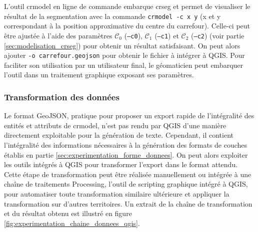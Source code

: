 \newpar{}

L'outil crmodel en ligne de commande embarque crseg et permet de visualiser le résultat de la segmentation avec la commande \texttt{crmodel -c x y} (x et y correspondant à la position approximative du centre du carrefour). Celle-ci peut être ajustée à l'aide des paramètres $\mathcal{C}_0$ (\texttt{--c0}), $\mathcal{C}_1$ (\texttt{--c1}) et $\mathcal{C}_2$ (\texttt{--c2}) (voir partie \ref{sec:modelisation_crseg}) pour obtenir un résultat satisfaisant. On peut alors ajouter \texttt{-o carrefour.geojson} pour obtenir le fichier à intégrer à QGIS. Pour faciliter son utilisation par un utilisateur final, le géomaticien peut embarquer l'outil dans un traitement graphique exposant ses paramètres.

\subsubsection{Transformation des données}

Le format GeoJSON, pratique pour proposer un export rapide de l'intégralité des entités et attributs de crmodel, n'est pas rendu par QGIS d'une manière directement exploitable pour la génération de texte. Cependant, il contient l'intégralité des informations nécessaires à la génération des formats de couches établis en partie \ref{sec:experimentation_forme_donnees}. On peut alors exploiter les outils intégrés à QGIS pour transformer l'export dans le format attendu. Cette étape de transformation peut être réalisée manuellement ou intégrée à une chaîne de traitements Processing, l'outil de scripting graphique intégré à QGIS, pour automatiser toute transformation similaire ultérieure et appliquer la transformation sur d'autres territoires. Un extrait de la chaîne de transformation et du résultat obtenu est illustré en figure \ref{fig:experimentation_chaine_donnees_qgis}.

